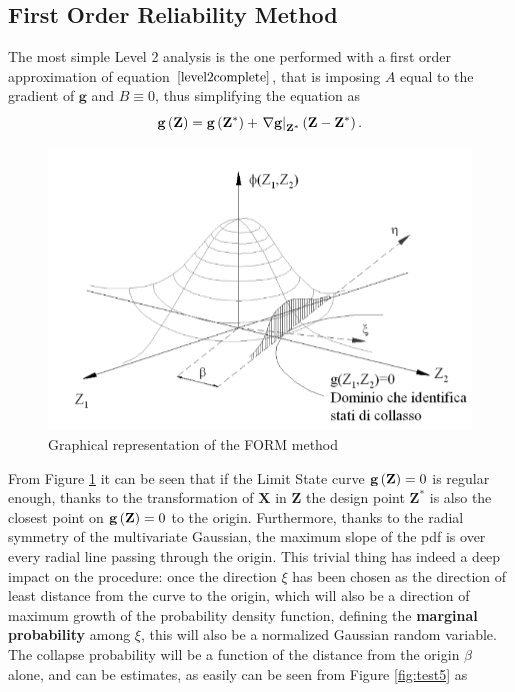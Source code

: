 \subsection{First Order Reliability Method}
The most simple Level 2 analysis is the one performed with a first order approximation of equation $\eqref{level2complete}$, that is imposing $A$ equal to the gradient of $\mathbf{g}$ and $B\equiv0$, thus simplifying the equation as
\begin{equation}\label{FORM}
\mathbf{g}\left( \mathbf{Z} \right)=\mathbf{g}\left( \mathbf{Z}^{*} \right)+\left.\nabla\mathbf{g} \right|_{\mathbf{Z}^{*}}\left( \mathbf{Z}-\mathbf{Z}^{*} \right).
\end{equation}
\begin{figure}[t]
\centering
  \includegraphics[scale=0.35]{./SurfWaves_figs/Hasofer_Lind_Method_approximations.png}
\caption{Graphical representation of the FORM method}
  \label{fig:test4}
\end{figure}
From Figure \ref{fig:test4} it can be seen that if the Limit State curve $\mathbf{g}\left( \mathbf{Z} \right)=0$ is regular enough, thanks to the transformation of $\mathbf{X}$ in $\mathbf{Z}$ the design point $\mathbf{Z}^{*}$ is also the closest point on $\mathbf{g}\left( \mathbf{Z} \right)=0$ to the origin. Furthermore, thanks to the radial symmetry of the multivariate Gaussian, the maximum slope of the pdf is over every radial line passing through the origin. This trivial thing has indeed a deep impact on the procedure: once the direction $\xi$ has been chosen as the direction of least distance from the curve to the origin, which will also be a direction of maximum growth of the probability density function, defining the \textbf{marginal probability} among $\xi$, this will also be a normalized Gaussian random variable. The collapse probability will be a function of the distance from the origin $\beta$ alone, and can be estimates, as easily can be seen from Figure \ref{fig:test5} as
